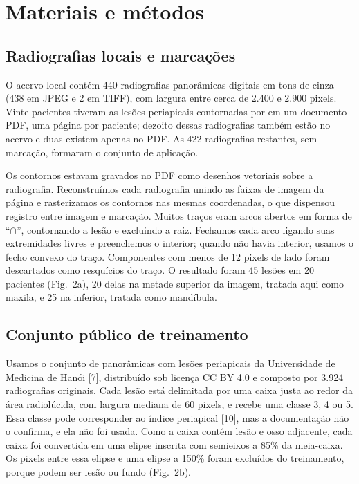 \documentclass[twocolumn]{article}
\begin{document}
\section{Materiais e métodos}

\subsection{Radiografias locais e marcações}

O acervo local contém 440 radiografias panorâmicas digitais em tons de cinza (438 em JPEG e 2 em TIFF), com largura entre cerca de 2.400 e 2.900 pixels. Vinte pacientes tiveram as lesões periapicais contornadas por  em um documento PDF, uma página por paciente; dezoito dessas radiografias também estão no acervo e duas existem apenas no PDF. As 422 radiografias restantes, sem marcação, formaram o conjunto de aplicação.

Os contornos estavam gravados no PDF como desenhos vetoriais sobre a radiografia. Reconstruímos cada radiografia unindo as faixas de imagem da página e rasterizamos os contornos nas mesmas coordenadas, o que dispensou registro entre imagem e marcação. Muitos traços eram arcos abertos em forma de ``$\cap$'', contornando a lesão e excluindo a raiz. Fechamos cada arco ligando suas extremidades livres e preenchemos o interior; quando não havia interior, usamos o fecho convexo do traço. Componentes com menos de 12 pixels de lado foram descartados como resquícios do traço. O resultado foram 45 lesões em 20 pacientes (Fig.~2a), 20 delas na metade superior da imagem, tratada aqui como maxila, e 25 na inferior, tratada como mandíbula.

\subsection{Conjunto público de treinamento}

Usamos o conjunto de panorâmicas com lesões periapicais da Universidade de Medicina de Hanói [7], distribuído sob licença CC BY 4.0 e composto por 3.924 radiografias originais. Cada lesão está delimitada por uma caixa justa ao redor da área radiolúcida, com largura mediana de 60 pixels, e recebe uma classe 3, 4 ou 5. Essa classe pode corresponder ao índice periapical [10], mas a documentação não o confirma, e ela não foi usada. Como a caixa contém lesão e osso adjacente, cada caixa foi convertida em uma elipse inscrita com semieixos a 85\% da meia-caixa. Os pixels entre essa elipse e uma elipse a 150\% foram excluídos do treinamento, porque podem ser lesão ou fundo (Fig.~2b).
\end{document}
